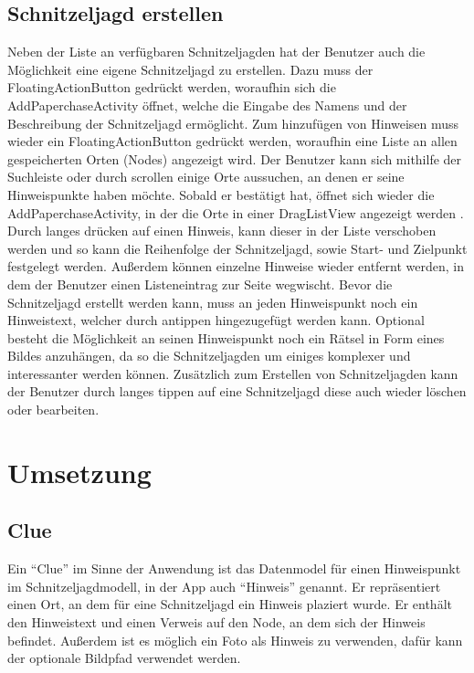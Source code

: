 \subsection{Schnitzeljagd erstellen}
Neben der Liste an verfügbaren Schnitzeljagden hat der Benutzer auch die Möglichkeit eine eigene Schnitzeljagd zu erstellen. Dazu muss der FloatingActionButton gedrückt werden, woraufhin sich die AddPaperchaseActivity öffnet, welche die Eingabe des Namens und der Beschreibung der Schnitzeljagd ermöglicht. Zum hinzufügen von Hinweisen muss wieder ein FloatingActionButton gedrückt werden, woraufhin eine Liste an allen gespeicherten Orten (Nodes) angezeigt wird. Der Benutzer kann sich mithilfe der Suchleiste oder durch scrollen einige Orte aussuchen, an denen er seine Hinweispunkte haben möchte. Sobald er bestätigt hat, öffnet sich wieder die AddPaperchaseActivity, in der die Orte in einer DragListView angezeigt werden \cite{woxblom_magnus_draglistview_2014} . Durch langes drücken auf einen Hinweis, kann dieser in der Liste verschoben werden und so kann die Reihenfolge der Schnitzeljagd, sowie Start- und Zielpunkt festgelegt werden. Außerdem können einzelne Hinweise wieder entfernt werden, in dem der Benutzer einen Listeneintrag zur Seite wegwischt. Bevor die Schnitzeljagd erstellt werden kann, muss an jeden Hinweispunkt noch ein Hinweistext, welcher durch antippen hingezugefügt werden kann. Optional besteht die Möglichkeit an seinen Hinweispunkt noch ein Rätsel in Form eines Bildes anzuhängen, da so die Schnitzeljagden um einiges komplexer und interessanter werden können. Zusätzlich zum Erstellen von Schnitzeljagden kann der Benutzer durch langes tippen auf eine Schnitzeljagd diese auch wieder löschen oder bearbeiten.

\section{Umsetzung}
\subsection{Clue}
Ein \enquote{Clue} im Sinne der Anwendung ist das Datenmodel für einen Hinweispunkt im Schnitzeljagdmodell, in der App auch \enquote{Hinweis} genannt. Er repräsentiert einen Ort, an dem für eine Schnitzeljagd ein Hinweis plaziert wurde. Er enthält den Hinweistext und einen Verweis auf den Node, an dem sich der Hinweis befindet. Außerdem ist es möglich ein Foto als Hinweis zu verwenden, dafür kann der optionale Bildpfad verwendet werden.


